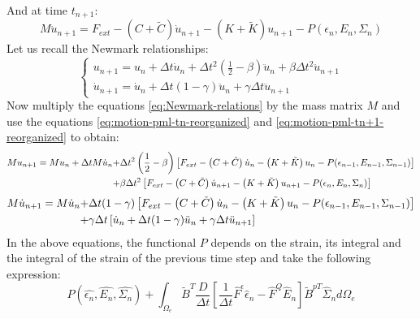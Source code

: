 And at time $t_{n+1}$:
\begin{equation}
M \ddot{u}_{n+1} = F_{ext} -\left(C+\tilde{C}\right)\dot{u}_{n+1} 
-\left(K+\tilde{K}\right)u_{n+1} - P(\epsilon_{n},E_{n},\Sigma_{n})
\label{eq:motion-pml-tn+1-reorganized}
\end{equation}
Let us recall the Newmark relationships:
\begin{equation}
	\begin{cases}
		u_{n+1} = u_n + \Delta t \dot{u}_n + \Delta t^2 \left(\frac{1}{2}-\beta\right)\ddot{u}_n + \beta \Delta t^2 \ddot{u}_{n+1} \\
		\dot{u}_{n+1} = \dot{u}_n + \Delta t (1-\gamma) \ddot{u}_n + \gamma \Delta t \ddot{u}_{n+1}
	\end{cases}
	\label{eq:Newmark-relations}
\end{equation}
Now multiply the equations \ref{eq:Newmark-relations} by the mass matrix $M$ and use the equations \ref{eq:motion-pml-tn-reorganized} and \ref{eq:motion-pml-tn+1-reorganized} to obtain:
\begin{align}
		M u_{n+1} = M u_n + \Delta t M \dot{u}_n + &  \Delta t^2 \left(\frac{1}{2}-\beta\right)\left[ F_{ext} -\left(C+\tilde{C}\right)\dot{u}_n -\left(K+\tilde{K}\right)u_n - P(\epsilon_{n-1},E_{n-1},\Sigma_{n-1}) \right]  \notag\\ + &  \beta \Delta t^2 \left[ F_{ext} -\left(C+\tilde{C}\right)\dot{u}_{n+1} 
-\left(K+\tilde{K}\right)u_{n+1} - P(\epsilon_{n},E_{n},\Sigma_{n}) \right] 
	\label{eq:main-relations1}
\end{align}
\begin{align}
		M \dot{u}_{n+1} = M \dot{u}_n +  &\Delta t (1-\gamma) \left[ F_{ext} -\left(C+\tilde{C}\right)\dot{u}_n 
-\left(K+\tilde{K}\right)u_n - P(\epsilon_{n-1},E_{n-1},\Sigma_{n-1}) \right] \notag\\ + & \gamma \Delta t \left[  \dot{u}_n + \Delta t (1-\gamma) \ddot{u}_n + \gamma \Delta t \ddot{u}_{n+1} \right]
	\label{eq:main-relations2}
\end{align}
In the above equations, the functional $P$ depends on the strain, its integral and the integral of the strain of the previous time step and take the following expression:
\begin{equation}
P(\hat{\epsilon_n},\hat{E_n},\hat{\Sigma_n}) + \int_{\Omega_e} \tilde{B}^T \frac{D}{\Delta t}\left[\frac{1}{\Delta t} \hat{F}^\epsilon \hat{\epsilon}_n - \hat{F}^Q \hat{E}_n  \right] \tilde{B}^{p T} \hat{\Sigma}_n d\Omega_e
\label{eq:P-exp}
\end{equation}

